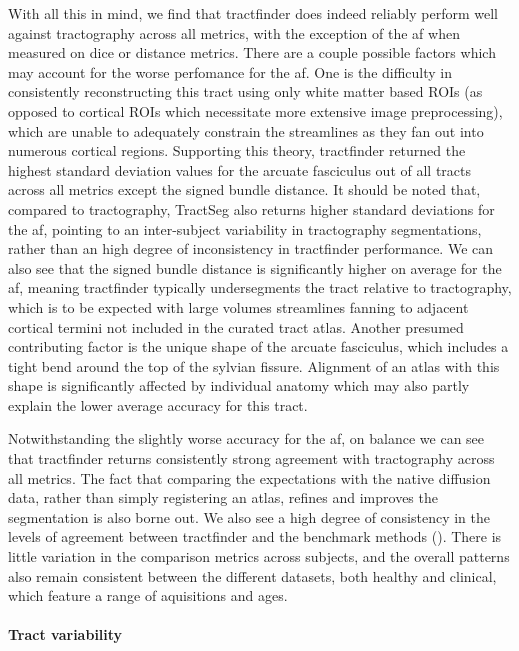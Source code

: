 With all this in mind, we find that tractfinder does indeed reliably perform well against tractography across all metrics, with the exception of the \gls{af} when measured on \gls{dice} or distance metrics.
There are a couple possible factors which may account for the worse perfomance for the \gls{af}.
One is the difficulty in consistently reconstructing this tract using only white matter based ROIs (as opposed to cortical ROIs which necessitate more extensive image preprocessing), which are unable to adequately constrain the streamlines as they fan out into numerous cortical regions.
Supporting this theory, tractfinder returned the highest standard deviation values for the arcuate fasciculus out of all  tracts across all metrics except the signed bundle distance.
It should be noted that, compared to tractography, TractSeg also returns higher standard deviations for the \gls{af}, pointing to an inter-subject variability in tractography segmentations, rather than an high degree of inconsistency in tractfinder performance.
We can also see that the signed bundle distance is significantly higher on average for the \gls{af}, meaning tractfinder typically undersegments the tract relative to tractography, which is to be expected with large volumes streamlines fanning to adjacent cortical termini not included in the curated tract atlas.
Another presumed contributing factor is the unique shape of the arcuate fasciculus, which includes a tight bend around the top of the sylvian fissure.
Alignment of an atlas with this shape is significantly affected by individual anatomy  which may also partly explain the lower average accuracy for this tract.

Notwithstanding the slightly worse accuracy for the \gls{af}, on balance we can see that tractfinder returns consistently strong agreement with tractography across all metrics.
The fact that comparing the expectations with the native diffusion data, rather than simply registering an atlas, refines and improves the segmentation is also borne out. 
We also see a high degree of consistency in the levels of agreement between tractfinder and the benchmark methods ().
There is little variation in the comparison metrics across subjects, and the overall patterns also remain consistent between the different datasets, both healthy and clinical, which feature a range of aquisitions and ages.

\paragraph*{Tract variability}

